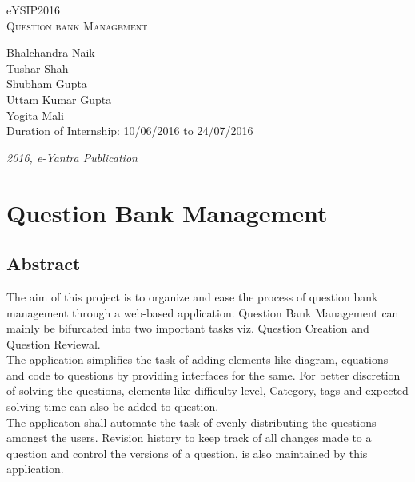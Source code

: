 \documentclass[a4paper,12pt,oneside]{book}
\begin{document}
\begin{titlepage}
\raggedright
{\Large eYSIP2016\\[1cm]}
{\Huge\scshape Question bank Management \\[.1in]}
\vfill
\begin{flushright}
{\large Bhalchandra Naik \\}
{\large Tushar Shah \\}
{\large Shubham Gupta \\}
{\large Uttam Kumar Gupta \\}
{\large Yogita Mali \\}
{\large Duration of Internship:  10/06/2016 to 24/07/2016  \\}
\end{flushright}

{\itshape 2016, e-Yantra Publication}
\end{titlepage}

\chapter[Project Tag]{Question Bank Management}
\section*{Abstract}

\hspace{0.6cm} The aim of this project is to organize and ease the process of question bank management through a web-based application. Question Bank Management can mainly be bifurcated into two important tasks viz. Question Creation and Question Reviewal.  \\

The application simplifies the task of adding elements like diagram, equations and code to questions by providing interfaces for the same. For better discretion of solving the questions, elements like difficulty level, Category, tags and expected solving time can also be added to question.	\\

The applicaton shall automate the task of evenly distributing the questions amongst the users.	Revision history to keep track of all changes made to a question and control the versions of a question, is also maintained by this application.	\\
\end{document}
